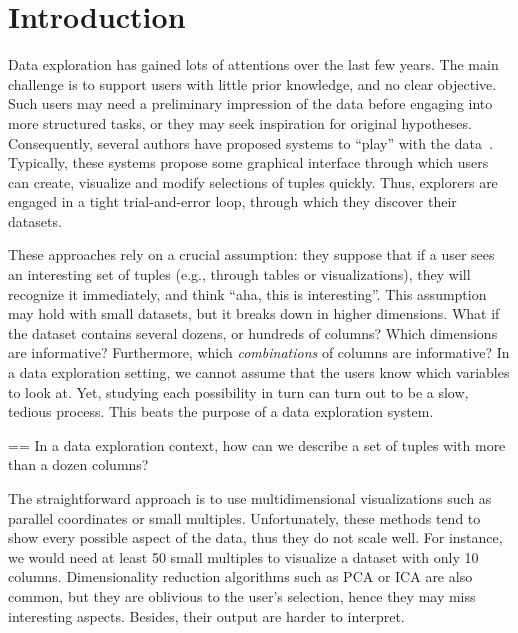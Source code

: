 \section{Introduction}
\label{sec:introdction}
Data exploration has gained lots of attentions over the last few years. The
main challenge is to support users with little prior knowledge, and no clear
objective. Such users may need a preliminary impression of the data before
engaging into more structured tasks, or they may  seek inspiration for original
hypotheses. Consequently, several authors have proposed systems to
``play'' with the data~\cite{abouzied2012dataplay, sellam2013meet,
liarou2014dbtouch, dimitriadou2014explore}. Typically, these systems propose
some graphical interface through which users can create, visualize and modify
selections of tuples quickly. Thus, explorers are engaged in a tight
trial-and-error loop, through which they discover their datasets. 

These approaches rely on a crucial assumption: they suppose that if a user sees
an interesting set of tuples (e.g., through tables or visualizations), they
will recognize it immediately, and think ``aha, this is interesting''. This
assumption may hold with small datasets, but it breaks down in higher
dimensions. What if the dataset contains several dozens, or hundreds of
columns? Which dimensions are informative? Furthermore, which
\emph{combinations} of columns are informative? In a data exploration setting,
we cannot assume that the users know which variables to look at. Yet, studying
each possibility in turn can turn out to be a slow, tedious
process. This beats the purpose of a data exploration system.
\begin{framed}
    \everypar={{=\lastbox}\everypar{}}
    In a data exploration context, how can we describe a set of tuples with
    more than a dozen columns?
\end{framed}

The straightforward approach is to use multidimensional visualizations such as
parallel coordinates or small multiples. Unfortunately, these methods tend to
show every possible aspect of the data, thus they do not scale well. For
instance, we would need at least 50 small multiples to visualize a dataset with
only 10 columns. Dimensionality reduction algorithms such as PCA or ICA are
also common, but they are oblivious to the user's selection, hence they may
miss interesting aspects.  Besides, their output are harder to interpret.

